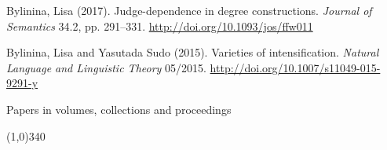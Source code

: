 \documentclass[12pt,letterpaper]{article}
\begin{document}
{\begin{hangparas}{.25in}{1}
\vspace{1mm} 

Bylinina, Lisa (2017). Judge-dependence in degree constructions. {\it Journal of Semantics} 34.2, pp. 291--331. \url{http://doi.org/10.1093/jos/ffw011}

\vspace{1mm}

Bylinina, Lisa and Yasutada Sudo (2015). Varieties of intensification. {\it Natural Language and Linguistic Theory} 05/2015. \url{http://doi.org/10.1007/s11049-015-9291-y}

\vspace{1mm}


\end{hangparas}
}

\vspace{5mm}

\noindent \Large{Papers in volumes, collections and proceedings}

\vspace{-4mm}
\noindent\line(1,0){340}
\end{document}
